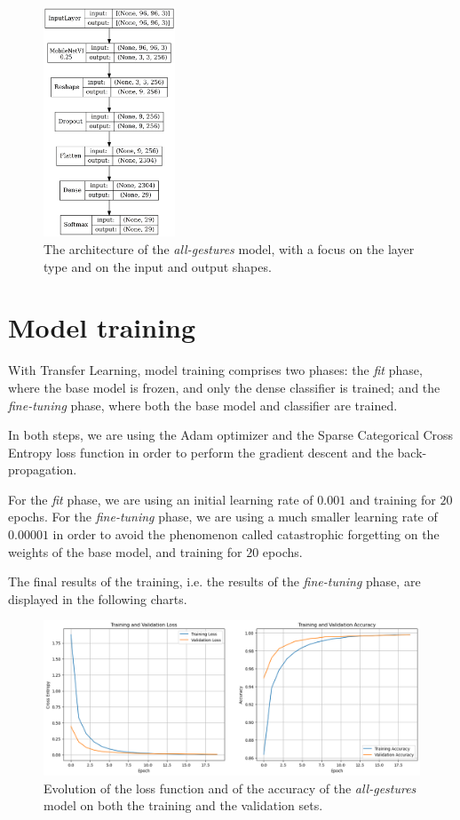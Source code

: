 \documentclass{Configuration_Files/PoliMi3i_thesis}
\begin{document}
\begin{figure}[H]
    \centering
    \includegraphics[width=0.35\textwidth]{Figures/all-gestures/all_model.png}
    \caption{The architecture of the \textit{all-gestures} model, with a focus on the layer type and on the input and output shapes.}
    \label{fig:all_architecture}
\end{figure}

\section{Model training}
\label{sec:all-training}
With Transfer Learning, model training comprises two phases: the \textit{fit} phase, where the base model is frozen, and only the dense classifier is trained; and the \textit{fine-tuning} phase, where both the base model and classifier are trained.

In both steps, we are using the Adam optimizer and the Sparse Categorical Cross Entropy loss function in order to perform the gradient descent and the back-propagation. 

For the \textit{fit} phase, we are using an initial learning rate of $0.001$ and training for $20$ epochs. For the \textit{fine-tuning} phase, we are using a much smaller learning rate of $0.00001$ in order to avoid the phenomenon called catastrophic forgetting on the weights of the base model, and training for $20$ epochs.

The final results of the training, i.e. the results of the \textit{fine-tuning} phase, are displayed in the following charts.
\begin{figure}[H]
    \centering
    \includegraphics[width=\textwidth]{Figures/all-gestures/all_loss.png}
    \caption{Evolution of the loss function and of the accuracy of the \textit{all-gestures} model on both the training and the validation sets.}
    \label{fig:all_loss}
\end{figure}
\end{document}
